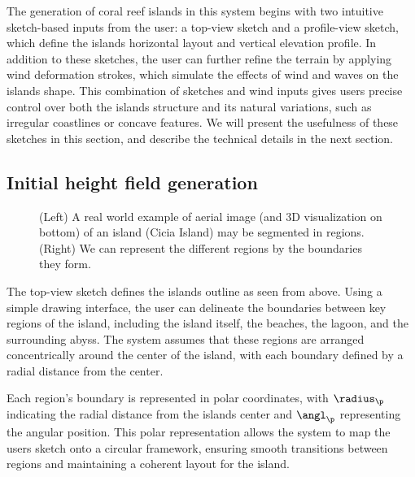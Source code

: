 
The generation of coral reef islands in this system begins with two intuitive sketch-based inputs from the user: a top-view sketch and a profile-view sketch, which define the islands horizontal layout and vertical elevation profile. In addition to these sketches, the user can further refine the terrain by applying wind deformation strokes, which simulate the effects of wind and waves on the islands shape. This combination of sketches and wind inputs gives users precise control over both the islands structure and its natural variations, such as irregular coastlines or concave features. We will present the usefulness of these sketches in this section, and describe the technical details in the next section.

\subsection{Initial height field generation}
\label{sec:coral-island-generation-initial}


\begin{figure}[H]
	\centering
    \caption{(Left) A real world example of aerial image (and 3D visualization on bottom) of an island (Cicia Island) may be segmented in regions. (Right) We can represent the different regions by the boundaries they form.}
    \label{fig:coral-island-top-view-sketch}
\end{figure}

The top-view sketch defines the islands outline as seen from above. Using a simple drawing interface, the user can delineate the boundaries between key regions of the island, including the island itself, the beaches, the lagoon, and the surrounding abyss. The system assumes that these regions are arranged concentrically around the center of the island, with each boundary defined by a radial distance from the center.

Each region's boundary is represented in polar coordinates, with $\radius_\p$ indicating the radial distance from the islands center and $\angl_\p$ representing the angular position. This polar representation allows the system to map the users sketch onto a circular framework, ensuring smooth transitions between regions and maintaining a coherent layout for the island.

